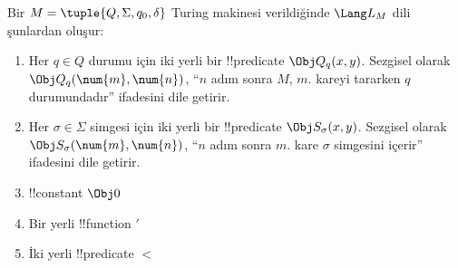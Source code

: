 \documentclass[../../../include/open-logic-section]{subfiles}
\begin{document}
\begin{defn}
Bir $M=\tuple{Q,\Sigma,q_0,\delta}$ Turing makinesi verildiğinde
$\Lang L_M$ dili şunlardan oluşur:
\begin{enumerate}
\item Her $q\in Q$ durumu için iki yerli bir !!{predicate}
  $\Obj Q_q(x,y)$. Sezgisel olarak $\Obj Q_q(\num{m},\num{n})$, ``$n$ adım
  sonra $M$, $m$. kareyi tararken $q$ durumundadır'' ifadesini dile getirir.
\item Her $\sigma\in\Sigma$ simgesi için iki yerli bir !!{predicate}
  $\Obj S_\sigma(x,y)$. Sezgisel olarak
  $\Obj S_\sigma(\num{m},\num{n})$, ``$n$ adım sonra $m$. kare $\sigma$
  simgesini içerir'' ifadesini dile getirir.
\item !!{constant} $\Obj 0$
\item Bir yerli !!{function} $\prime$
\item İki yerli !!{predicate} $<$
\end{enumerate}
\end{defn}
\end{document}
